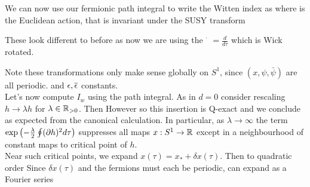 \documentclass{article}
\begin{document}
We can now use our fermionic path integral to write the Witten index as 
where 
is the Euclidean action, that is invariant under the SUSY transform 
\begin{remark}
	These look different to before as now we are using the $\dot{\phantom{x}} = \frac{d}{d\tau}$ which is Wick rotated.
\end{remark}
Note these transformations only make sense globally on $S^1$, since $(x,\psi,\bar{\psi})$ are all periodic. and $\epsilon,\overline{\epsilon}$ constants. \\
Let's now compute $I_w$ using the path integral. As in $d=0$ consider rescaling $h \to \lambda h$ for $\lambda \in \mathbb{R}_{>0}$. Then 
However 
so this insertion is Q-exact and we conclude 
as expected from the canonical calculation. In particular, as $\lambda \to \infty$ the term $\exp\left( -\frac{\lambda}{2} \oint (\partial h)^2 d\tau \right)$ suppresses all maps $x:S^1\to\mathbb{R}$ except in a neighbourhood of constant maps to critical point of $h$. \\
Near such critical points, we expand $x(\tau) = x_\ast + \delta x (\tau)$. Then to quadratic order 
Since $\delta x(\tau)$ and the fermions must each be periodic, can expand as a Fourier series
\end{document}
